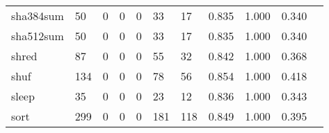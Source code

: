 \begin{longtable}{lp{1.2cm}p{1.2cm}p{1.2cm}p{1.2cm}p{1.2cm}p{1.2cm}p{1.2cm}p{1.2cm}p{1.2cm}p{1.2cm}}
sha384sum &                                    50 &                                                  0 &                                                  0 &                                                  0 &                                                 33 &                                                 17 &                                              0.835 &                                              1.000 &                                              0.340 \\
sha512sum &                                    50 &                                                  0 &                                                  0 &                                                  0 &                                                 33 &                                                 17 &                                              0.835 &                                              1.000 &                                              0.340 \\
shred     &                                    87 &                                                  0 &                                                  0 &                                                  0 &                                                 55 &                                                 32 &                                              0.842 &                                              1.000 &                                              0.368 \\
shuf      &                                   134 &                                                  0 &                                                  0 &                                                  0 &                                                 78 &                                                 56 &                                              0.854 &                                              1.000 &                                              0.418 \\
sleep     &                                    35 &                                                  0 &                                                  0 &                                                  0 &                                                 23 &                                                 12 &                                              0.836 &                                              1.000 &                                              0.343 \\
sort      &                                   299 &                                                  0 &                                                  0 &                                                  0 &                                                181 &                                                118 &                                              0.849 &                                              1.000 &                                              0.395 \\

\end{longtable}
